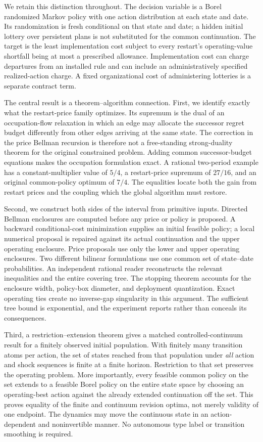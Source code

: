 We retain this distinction throughout. The decision variable is a Borel randomized Markov policy with one action distribution at each state and date. Its randomization is fresh conditional on that state and date; a hidden initial lottery over persistent plans is not substituted for the common continuation. The target is the least implementation cost subject to every restart's operating-value shortfall being at most a prescribed allowance. Implementation cost can charge departures from an installed rule and can include an administratively specified realized-action charge. A fixed organizational cost of administering lotteries is a separate contract term.

The central result is a theorem--algorithm connection. First, we identify exactly what the restart-price family optimizes. Its supremum is the dual of an occupation-flow relaxation in which an edge may allocate the successor regret budget differently from other edges arriving at the same state. The correction in the price Bellman recursion is therefore not a free-standing strong-duality theorem for the original constrained problem. Adding common successor-budget equations makes the occupation formulation exact. A rational two-period example has a constant-multiplier value of $5/4$, a restart-price supremum of $27/16$, and an original common-policy optimum of $7/4$. The equalities locate both the gain from restart prices and the coupling which the global algorithm must restore.

Second, we construct both sides of the interval from primitive inputs. Directed Bellman enclosures are computed before any price or policy is proposed. A backward conditional-cost minimization supplies an initial feasible policy; a local numerical proposal is repaired against its actual continuation and the upper operating enclosure. Price proposals use only the lower and upper operating enclosures. Two different bilinear formulations use one common set of state--date probabilities. An independent rational reader reconstructs the relevant inequalities and the entire covering tree. The stopping theorem accounts for the enclosure width, policy-box diameter, and deployment quantization. Exact operating ties create no inverse-gap singularity in this argument. The sufficient tree bound is exponential, and the experiment reports rather than conceals its consequences.

Third, a restriction--extension theorem gives a matched controlled-continuum result for a finitely observed initial population. With finitely many transition atoms per action, the set of states reached from that population under \emph{all} action and shock sequences is finite at a finite horizon. Restriction to that set preserves the operating problem. More importantly, every feasible common policy on the set extends to a feasible Borel policy on the entire state space by choosing an operating-best action against the already extended continuation off the set. This proves equality of the finite and continuum revision optima, not merely validity of one endpoint. The dynamics may move the continuous state in an action-dependent and noninvertible manner. No autonomous type label or transition smoothing is required.

